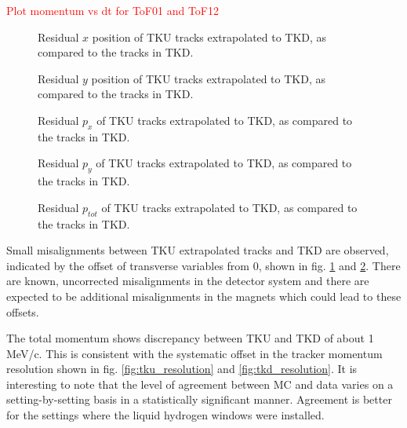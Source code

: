 \textcolor{red}{Plot momentum vs dt for ToF01 and ToF12}

\begin{figure}[!tbh]
    \centering
    {Residual $x$ position of TKU tracks extrapolated to TKD, as compared to the tracks in TKD. \label{fig:tkd_extrapolated_x}}
\end{figure}

\begin{figure}[!tbh]
    \centering
    {Residual $y$ position of TKU tracks extrapolated to TKD, as compared to the tracks in TKD. \label{fig:tkd_extrapolated_y}}
\end{figure}

\begin{figure}[!tbh]
    \centering
    {Residual $p_x$ of TKU tracks extrapolated to TKD, as compared to the tracks in TKD. \label{fig:tkd_extrapolated_px}}
\end{figure}

\begin{figure}[!tbh]
    \centering
    {Residual $p_y$ of TKU tracks extrapolated to TKD, as compared to the tracks in TKD. \label{fig:tkd_extrapolated_py}}
\end{figure}

\begin{figure}[!tbh]
    \centering
    {Residual $p_{tot}$ of TKU tracks extrapolated to TKD, as compared to the tracks in TKD. \label{fig:tkd_extrapolated_p}}
\end{figure}

Small misalignments between TKU extrapolated tracks and TKD are observed, 
indicated by the offset of transverse variables from 0, shown in 
fig. \ref{fig:tkd_extrapolated_x} and \ref{fig:tkd_extrapolated_y}. There are known, 
uncorrected misalignments in the detector system and there are expected to be 
additional misalignments in the magnets which could lead to these offsets.

The total momentum shows discrepancy between TKU and TKD of about 1 MeV/c. This
is consistent with the systematic offset in the tracker momentum resolution 
shown in fig. \ref{fig:tku_resolution} and \ref{fig:tkd_resolution}. It is
interesting to note that the level of agreement between MC and data varies
on a setting-by-setting basis in a statistically significant manner. Agreement
is better for the settings where the liquid hydrogen windows were installed.

